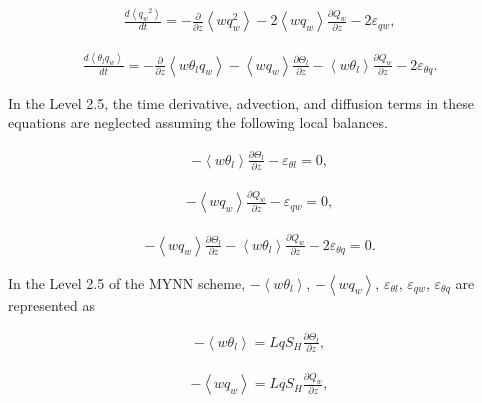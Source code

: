 \begin{eqnarray}
\frac{d\left\langle {q_w}^{2}\right\rangle}{d t}=-\frac{\partial}{\partial z}\left\langle w q_{w}^{2}\right\rangle-2\left\langle w q_{w}\right\rangle \frac{\partial Q_{w}}{\partial z}-2 \varepsilon_{q w},
\end{eqnarray}

\begin{eqnarray}
\frac{d\left\langle\theta_{l} q_{w}\right\rangle}{d t}=-\frac{\partial}{\partial z}\left\langle w \theta_{l} q_{w}\right\rangle-\left\langle w q_{w}\right\rangle \frac{\partial \Theta_{l}}{\partial z}-\left\langle w \theta_{l}\right\rangle \frac{\partial Q_{w}}{\partial z}-2 \varepsilon_{\theta q}.
\end{eqnarray}

In the Level 2.5, the time derivative, advection, and diffusion terms in these equations are neglected assuming the following local balances.

\begin{eqnarray} -\left\langle w \theta_{l}\right\rangle \frac{\partial \Theta_{l}}{\partial z}-\varepsilon_{\theta l} = 0 \label{p-dif.6},\end{eqnarray}

\begin{eqnarray} -\left\langle w q_{w}\right\rangle \frac{\partial Q_{w}}{\partial z}-\varepsilon_{q w} = 0 \label{p-dif.7},\end{eqnarray}

\begin{eqnarray} -\left\langle w q_{w}\right\rangle \frac{\partial \Theta_{l}}{\partial z}-\left\langle w \theta_{l}\right\rangle \frac{\partial Q_{w}}{\partial z}-2 \varepsilon_{\theta q} = 0 \label{p-dif.8}.\end{eqnarray}

In the Level 2.5 of the MYNN scheme, \(-\left\langle w \theta_{l}\right\rangle\), \(-\left\langle w q_{w}\right\rangle\), \(\varepsilon_{\theta l}\), \(\varepsilon_{q w}\), \(\varepsilon_{\theta q}\)
are represented as

\begin{eqnarray} -\left\langle w \theta_{l}\right\rangle = LqS_H \frac{\partial \Theta_{l}}{\partial z} \label{p-dif.9},\end{eqnarray}

\begin{eqnarray} -\left\langle w q_{w}\right\rangle = LqS_H \frac{\partial Q_{w}}{\partial z} \label{p-dif.10},\end{eqnarray}

